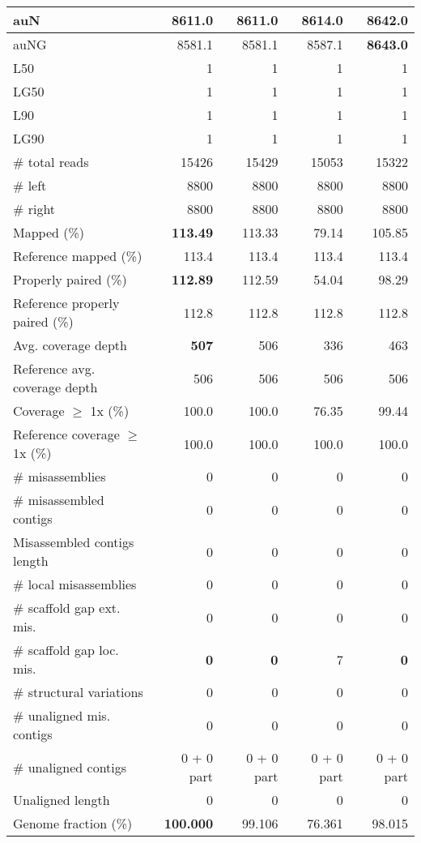 \documentclass[12pt,a4paper]{article}
\begin{document}
\begin{table}[ht]
\begin{center}
\begin{tabular}{|l*{4}{|r}|}
auN & 8611.0 & 8611.0 & 8614.0 & {\bf 8642.0} \\ \hline
auNG & 8581.1 & 8581.1 & 8587.1 & {\bf 8643.0} \\ \hline
L50 & 1 & 1 & 1 & 1 \\ \hline
LG50 & 1 & 1 & 1 & 1 \\ \hline
L90 & 1 & 1 & 1 & 1 \\ \hline
LG90 & 1 & 1 & 1 & 1 \\ \hline
\# total reads & 15426 & 15429 & 15053 & 15322 \\ \hline
\# left & 8800 & 8800 & 8800 & 8800 \\ \hline
\# right & 8800 & 8800 & 8800 & 8800 \\ \hline
Mapped (\%) & {\bf 113.49} & 113.33 & 79.14 & 105.85 \\ \hline
Reference mapped (\%) & 113.4 & 113.4 & 113.4 & 113.4 \\ \hline
Properly paired (\%) & {\bf 112.89} & 112.59 & 54.04 & 98.29 \\ \hline
Reference properly paired (\%) & 112.8 & 112.8 & 112.8 & 112.8 \\ \hline
Avg. coverage depth & {\bf 507} & 506 & 336 & 463 \\ \hline
Reference avg. coverage depth & 506 & 506 & 506 & 506 \\ \hline
Coverage $\geq$ 1x (\%) & 100.0 & 100.0 & 76.35 & 99.44 \\ \hline
Reference coverage $\geq$ 1x (\%) & 100.0 & 100.0 & 100.0 & 100.0 \\ \hline
\# misassemblies & 0 & 0 & 0 & 0 \\ \hline
\# misassembled contigs & 0 & 0 & 0 & 0 \\ \hline
Misassembled contigs length & 0 & 0 & 0 & 0 \\ \hline
\# local misassemblies & 0 & 0 & 0 & 0 \\ \hline
\# scaffold gap ext. mis. & 0 & 0 & 0 & 0 \\ \hline
\# scaffold gap loc. mis. & {\bf 0} & {\bf 0} & 7 & {\bf 0} \\ \hline
\# structural variations & 0 & 0 & 0 & 0 \\ \hline
\# unaligned mis. contigs & 0 & 0 & 0 & 0 \\ \hline
\# unaligned contigs & 0 + 0 part & 0 + 0 part & 0 + 0 part & 0 + 0 part \\ \hline
Unaligned length & 0 & 0 & 0 & 0 \\ \hline
Genome fraction (\%) & {\bf 100.000} & 99.106 & 76.361 & 98.015 \\ \hline

\end{tabular}
\end{center}
\end{table}
\end{document}

